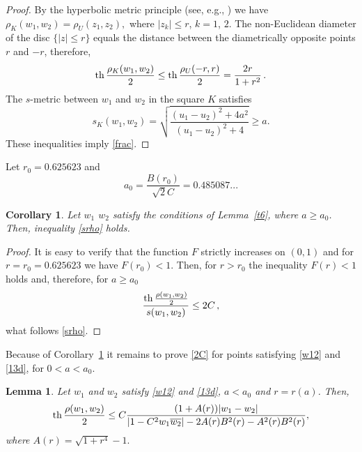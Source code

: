 \documentclass[12pt,a4paper]{amsart}
\newtheorem{lemma}{Lemma}
\newtheorem{cor}{Corollary}
\def\th{\mathop{\rm th}\nolimits}
\begin{document}
\begin{proof} By the hyperbolic metric principle (see, e.g., \cite[ch.~VIII]{goluzin}) we have
$\rho_K(w_1,w_2)=\rho_U(z_1,z_2),$ where $|z_k|\le r$, $k=1$, $2$.
The non-Euclidean diameter of the disc $\{|z|\le r\}$  equals the
distance between the diametrically opposite points $r$ and $-r$,
therefore,
$$
\th\frac{\rho_K(w_1,w_2)}{2}\le\th\frac{\rho_U(-r,r)}{2}=\frac{2r}{1+r^2}\,.
$$
The $s$-metric between $w_1$ and  $w_2$  in the square $K$ satisfies
\begin{equation}\label{sK}
s_K(w_1,w_2)=\sqrt{\frac{(u_1-u_2)^2+4a^2}{(u_1-u_2)^2+4}}\ge a.
\end{equation}
These inequalities imply \eqref{frac}.
\end{proof}

Let $r_0=0.625623$ and
\begin{equation}\label{11d}
a_0=\frac{B(r_0)}{\sqrt{2}C}=0.485087...
\end{equation}

\begin{cor} \label{t7}
Let $w_1$  $w_2$ satisfy the conditions of Lemma~\ref{t6}, where $a\ge a_0$. Then,  inequality \eqref{srho} holds.
\end{cor}

\begin{proof}
It is easy to verify that the function $F$ strictly increases on $(0,1)$ and for $r=r_0=0.625623$ we have $F(r_0)<1$.
Then, for $r>r_0$ the inequality $F(r)<1$ holds and, therefore, for $a\ge a_0$
\begin{equation}\label{2C}
\frac{\th\frac{\rho(w_1,w_2)}{2}}{s(w_1,w_2)}
\le {2}{C}\,,
\end{equation}
what follows \eqref{srho}.
\end{proof}

Because of Corollary~\ref{t7} it remains to prove \eqref{2C} for points satisfying \eqref{w12} and \eqref{13d},
for $0<a<a_0$.

\begin{lemma} \label{t8}
Let
$w_1$ and $w_2$ satisfy \eqref{w12} and \eqref{13d}, $a<a_0$ and $r=r(a)$. Then,
$$
\th\frac{\rho(w_1,w_2)}{2}
\le C\frac{(1+A(r))|w_1-w_2|}{ |1-C^2w_1\overline{w_2}|-2A(r)B^2(r)-A^2(r)B^2(r)},
$$
where
$
A(r)=\sqrt{1+r^4}-1.
$

\end{lemma}
\end{document}
